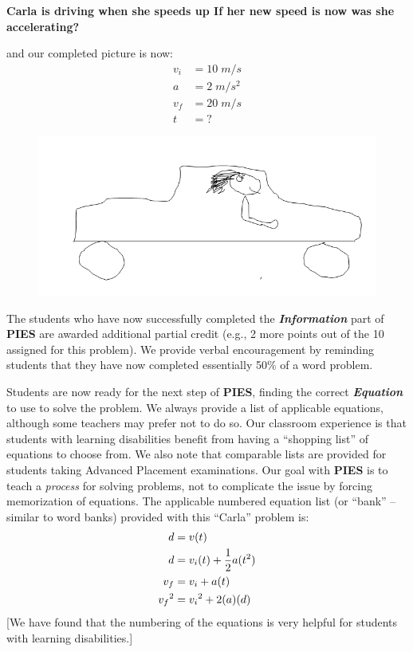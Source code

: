 \documentclass[11.5pt]{sig-alternate} %
\begin{document}
\begin{large}
\textbf{Carla is driving  when she speeds up  If her new speed is now   was she accelerating?}

and our completed picture is now:
\begin{align*}
    v_{i} &= 10\;m/s \\
    a &= 2\;m/s^{2} \\
    v_{f} &=20\;m/s \\
    t &= ?
\end{align*}
\begin{figure}[h]
    \centering
    \includegraphics[width=1\linewidth]{img1.jpg}
\end{figure}

The students who have now successfully completed the \textbf{\textit{Information}} part of \textbf{PIES} are awarded additional partial credit (e.g., 2 more points out of the 10 assigned for this problem). We provide verbal encouragement by reminding students that they have now completed essentially 50\% of a word problem.

Students are now ready for the next step of \textbf{PIES}, finding the correct \textbf{\textit{Equation}} to use to solve the problem. We always provide a list of applicable equations, although some teachers may prefer not to do so. Our classroom experience is that students with learning disabilities benefit from having a “shopping list” of equations to choose from. We also  note that comparable lists are provided for students taking Advanced Placement examinations. Our goal with \textbf{PIES} is to teach a \textit{process} for solving problems, not to complicate the issue by forcing memorization of equations. The applicable numbered equation list (or “bank” – similar to word banks) provided with this “Carla” problem is:  
\begin{align}
    d &= v (t) \\
    d &= v_{i} (t) + \frac{1}{2} a (t^{2}) \\
    v_{f} &= v_{i} + a (t) \\
    v_{f}\vspace{1em}^{2} &= v_{i}\vspace{1em}^{2} + 2 (a) (d)
\end{align}
[We have found that the numbering of the equations is very helpful for students with learning disabilities.]


\end{large}
\end{document}
